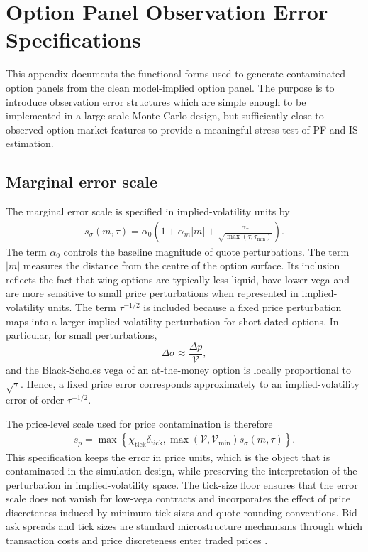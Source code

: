 \documentclass[11pt,a4paper,notitlepage]{article}
\numberwithin{equation}{section}
\begin{document}
\section{Option Panel Observation Error Specifications}
\label{app:option_noise_specs}

This appendix documents the functional forms used to generate contaminated option panels from the clean model-implied
option panel. The purpose is to introduce observation error structures which are simple enough to be implemented in a
large-scale Monte Carlo design, but sufficiently close to observed option-market features to provide a meaningful
stress-test of PF and IS estimation.

\subsection{Marginal error scale}
The marginal error scale is specified in implied-volatility units by
\begin{align}
s_\sigma(m,\tau)
=
\alpha_0\left(
1+\alpha_m |m|
+\frac{\alpha_\tau}{\sqrt{\max(\tau,\tau_{\min})}}
\right).
\label{eq:app_iv_error_scale}
\end{align}
The term $\alpha_0$ controls the baseline magnitude of quote perturbations. The term $|m|$ measures the distance
from the centre of the option surface. Its inclusion reflects the fact that wing options are typically less liquid,
have lower vega and are more sensitive to small price perturbations when represented in implied-volatility units.
The term $\tau^{-1/2}$ is included because a fixed price perturbation maps into a larger implied-volatility
perturbation for short-dated options. In particular, for small perturbations,
\[
\Delta\sigma \approx \frac{\Delta p}{\mathcal{V}},
\]
and the Black-Scholes vega of an at-the-money option is locally proportional to $\sqrt{\tau}$. Hence, a fixed
price error corresponds approximately to an implied-volatility error of order $\tau^{-1/2}$.

The price-level scale used for price contamination is therefore
\begin{align}
s_p
=
\max\left\{
\chi_{\mathrm{tick}}\delta_{\mathrm{tick}},
\max(\mathcal{V},\mathcal{V}_{\min})s_\sigma(m,\tau)
\right\}.
\label{eq:app_price_error_scale}
\end{align}
This specification keeps the error in price units, which is the object that is contaminated in the simulation
design, while preserving the interpretation of the perturbation in implied-volatility space. The tick-size floor
ensures that the error scale does not vanish for low-vega contracts and incorporates the effect of price discreteness
induced by minimum tick sizes and quote rounding conventions. Bid-ask spreads and tick sizes are standard
microstructure mechanisms through which transaction costs and price discreteness enter traded prices
\citep{demsetz1968cost}.
\end{document}
